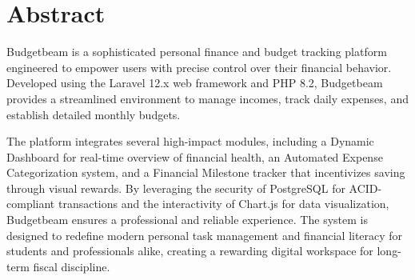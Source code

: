 \chapter*{Abstract}
Budgetbeam is a sophisticated personal finance and budget tracking platform engineered to empower users with precise control over their financial behavior. Developed using the Laravel 12.x web framework and PHP 8.2, Budgetbeam provides a streamlined environment to manage incomes, track daily expenses, and establish detailed monthly budgets.

The platform integrates several high-impact modules, including a Dynamic Dashboard for real-time overview of financial health, an Automated Expense Categorization system, and a Financial Milestone tracker that incentivizes saving through visual rewards. By leveraging the security of PostgreSQL for ACID-compliant transactions and the interactivity of Chart.js for data visualization, Budgetbeam ensures a professional and reliable experience. The system is designed to redefine modern personal task management and financial literacy for students and professionals alike, creating a rewarding digital workspace for long-term fiscal discipline.
